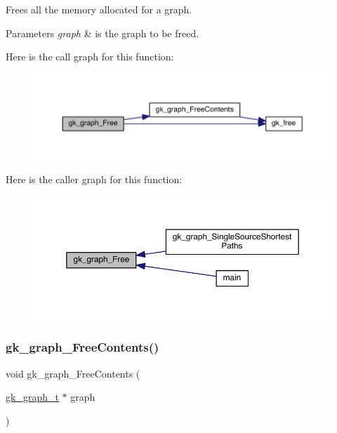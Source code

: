 Frees all the memory allocated for a graph. 
\begin{DoxyParams}{Parameters}
{\em graph} & is the graph to be freed. \\
\hline
\end{DoxyParams}
Here is the call graph for this function\+:\nopagebreak
\begin{figure}[H]
\begin{center}
\leavevmode
\includegraphics[width=350pt]{a00846_a1c12a8da8ea4064302668e0ce94ad462_cgraph}
\end{center}
\end{figure}
Here is the caller graph for this function\+:\nopagebreak
\begin{figure}[H]
\begin{center}
\leavevmode
\includegraphics[width=350pt]{a00846_a1c12a8da8ea4064302668e0ce94ad462_icgraph}
\end{center}
\end{figure}
\mbox{\label{a00846_a00a7be5e2819fb9444360695e8d047d3}} 
\subsubsection{\texorpdfstring{gk\+\_\+graph\+\_\+\+Free\+Contents()}{gk\_graph\_FreeContents()}}
{\footnotesize\ttfamily void gk\+\_\+graph\+\_\+\+Free\+Contents (\begin{DoxyParamCaption}\item[{\hyperlink{a00638}{gk\+\_\+graph\+\_\+t} $\ast$}]{graph }\end{DoxyParamCaption})}

